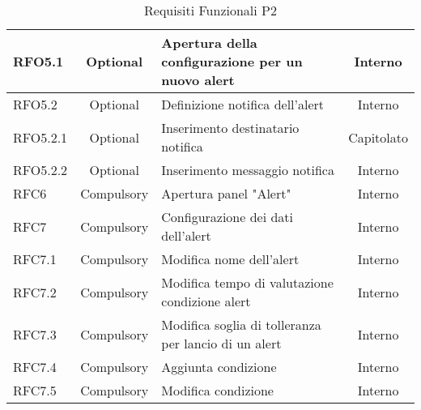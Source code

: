 \begin{table}[!htpb]
\begin{tabular}{|l|c|p{9cm}|c|}
                \hline
                RFO5.1 & Optional & Apertura della configurazione per un nuovo alert & Interno\\
                \hline
                RFO5.2 & Optional & Definizione notifica dell'alert & Interno\\
                \hline
                RFO5.2.1 & Optional & Inserimento destinatario notifica & Capitolato\\
                \hline
                RFO5.2.2 & Optional & Inserimento messaggio notifica & Interno\\
                \hline
                RFC6 & Compulsory & Apertura panel "Alert" & Interno\\
                \hline
                RFC7 & Compulsory & Configurazione dei dati dell'alert & Interno\\
                \hline
                RFC7.1 & Compulsory & Modifica nome dell'alert & Interno\\
                \hline
                RFC7.2 & Compulsory & Modifica tempo di valutazione condizione alert & Interno\\
                \hline
                RFC7.3 & Compulsory & Modifica soglia di tolleranza per lancio di un alert & Interno\\
                \hline
                RFC7.4 & Compulsory & Aggiunta condizione & Interno\\
                \hline
                RFC7.5 & Compulsory & Modifica condizione & Interno\\
                \hline
            \end{tabular}
            \caption{Requisiti Funzionali P2}
        \end{table}
